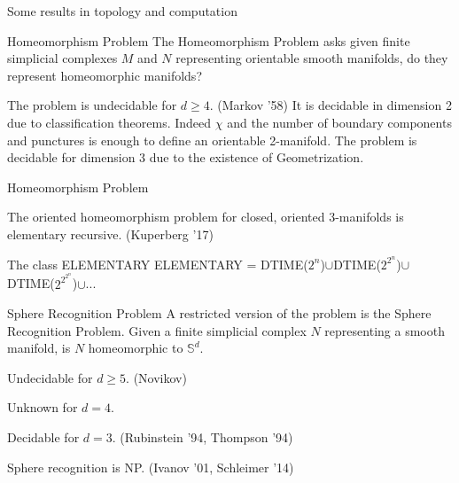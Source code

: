 \documentclass{beamer}
\begin{document}
\begin{section}{Some results in topology and computation}

\begin{frame}{Homeomorphism Problem }
        The Homeomorphism Problem asks given finite simplicial complexes $M$ and $N$ representing orientable smooth manifolds, do they represent homeomorphic manifolds? 
        
        The problem is undecidable for $d\geq 4$. (Markov '58)
        \newline
        \newline
        It is decidable in dimension 2 due to classification theorems. Indeed $\chi$ and the number of boundary components and punctures is enough to define an orientable 2-manifold. 
        \newline
        \newline
        The problem is decidable for dimension 3 due to the existence of Geometrization.
        \newline
        \newline
        
\end{frame}
        
\begin{frame}{Homeomorphism Problem}
    
        The oriented homeomorphism problem for closed, oriented 3-manifolds is elementary recursive. (Kuperberg '17)
        \begin{block}{The class ELEMENTARY} 
            ELEMENTARY = DTIME($2^n$)$\cup$DTIME($2^{2^n}$)$\cup$DTIME($2^{2^{2^n}}$)$\cup$...
        \end{block}
    
        
\end{frame}
    
\begin{frame}{Sphere Recognition Problem}
        A restricted version of the problem is the Sphere Recognition Problem. Given a finite simplicial complex $N$ representing a smooth manifold, is $N$ homeomorphic to $\mathbb{S}^d$. 
        
        Undecidable for $d\geq 5$. (Novikov)
        
        Unknown for $d=4$.
        
        Decidable for $d=3$. (Rubinstein '94, Thompson '94)
        
        Sphere recognition is NP. (Ivanov '01, Schleimer '14)
        

\end{frame}
\end{section}
\end{document}

